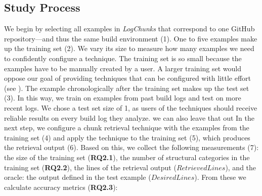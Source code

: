 \subsection{Study Process}
We begin by selecting all examples in \emph{LogChunks}
that correspond to one GitHub repository---and thus the
same build environment (1).
One to five examples make up the training set (2).
We vary its size to measure how many examples we need to
confidently configure a technique.
The training set is so small because the examples have to be
manually created by a user.
A larger training set would oppose our goal of providing techniques
that can be configured with little effort
(see ).
The example chronologically after the training set makes up the
test set (3).
In this way, we train on examples from past build logs and test on
more recent logs.
We chose a test set size of 1, as users of the techniques
should receive reliable results on every build log they analyze.
we can also leave that out
In the next step, we configure a chunk retrieval technique with
the examples from the training set (4) and apply the technique to the
training set (5), which produces the retrieval output (6).
Based on this, we collect the following measurements (7):
the size of the training set (\textbf{RQ2.1}),
the number of structural categories in the training
set (\textbf{RQ2.2}),
the lines of the retrieval output ($\mathit{RetrievedLines}$),
and the oracle: the output defined in the test example
($\mathit{DesiredLines}$).
From these we calculate accuracy metrics (\textbf{RQ2.3}):


